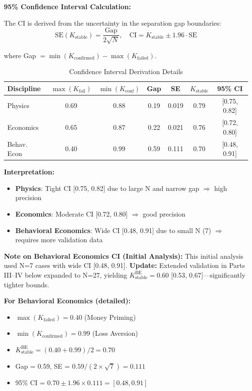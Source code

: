 \documentclass[11pt,a4paper]{article}
\begin{document}
\textbf{95\% Confidence Interval Calculation:}

The CI is derived from the uncertainty in the separation gap boundaries:
\[
\text{SE}(K_{\text{stable}}) = \frac{\text{Gap}}{2\sqrt{N}}, \quad \text{CI} = K_{\text{stable}} \pm 1.96 \cdot \text{SE}
\]

where Gap $= \min(K_{\text{confirmed}}) - \max(K_{\text{failed}})$.

\begin{table}[h]
\centering
\caption{Confidence Interval Derivation Details}
\begin{tabular}{lcccccc}
\toprule
\textbf{Discipline} & $\max(K_{\text{fail}})$ & $\min(K_{\text{conf}})$ & \textbf{Gap} & \textbf{SE} & $K_{\text{stable}}$ & \textbf{95\% CI} \\
\midrule
Physics & 0.69 & 0.88 & 0.19 & 0.019 & 0.79 & [0.75, 0.82] \\
Economics & 0.65 & 0.87 & 0.22 & 0.021 & 0.76 & [0.72, 0.80] \\
Behav. Econ & 0.40 & 0.99 & 0.59 & 0.111 & 0.70 & [0.48, 0.91] \\
\bottomrule
\end{tabular}
\end{table}

\textbf{Interpretation:}
\begin{itemize}
    \item \textbf{Physics}: Tight CI [0.75, 0.82] due to large N and narrow gap $\Rightarrow$ high precision
    \item \textbf{Economics}: Moderate CI [0.72, 0.80] $\Rightarrow$ good precision
    \item \textbf{Behavioral Economics}: Wide CI [0.48, 0.91] due to small N (7) $\Rightarrow$ requires more validation data
\end{itemize}

\begin{warningbox}
\textbf{Note on Behavioral Economics CI (Initial Analysis):} This initial analysis used N=7 cases with wide CI [0.48, 0.91]. \textbf{Update:} Extended validation in Parts III--IV below expanded to N=27, yielding $K_{\text{stable}}^{\text{BE}} = 0.60$ [0.53, 0.67]---significantly tighter bounds.
\end{warningbox}

\textbf{For Behavioral Economics (detailed):}
\begin{itemize}
    \item $\max(K_{\text{failed}}) = 0.40$ (Money Priming)
    \item $\min(K_{\text{confirmed}}) = 0.99$ (Loss Aversion)
    \item $K_{\text{stable}}^{\text{BE}} = (0.40 + 0.99) / 2 = 0.70$
    \item Gap = 0.59, SE = $0.59 / (2 \times \sqrt{7}) = 0.111$
    \item 95\% CI = $0.70 \pm 1.96 \times 0.111 = [0.48, 0.91]$
\end{itemize}
\end{document}
